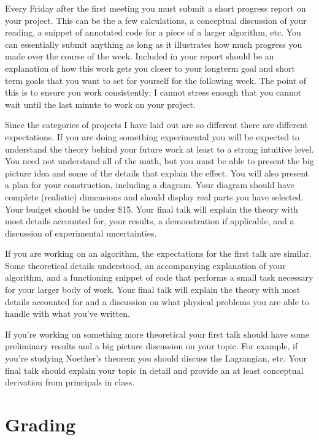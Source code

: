 \documentclass{article}
\begin{document}
Every Friday after the first meeting you must submit a short progress report  on your project.
This can be the a few calculations, a conceptual discussion of your reading, a snippet of annotated code for a piece of a larger algorithm, etc.
You can essentially submit anything as long as it illustrates how much progress you made over the course of the week.
Included in your report should be an explanation of how this work gets you closer to your longterm goal and short term goals that you want to set for yourself for the following week.
The point of this is to ensure you work consistently; I cannot stress enough that you cannot wait until the last minute to work on your project.

Since the categories of projects I have laid out are so different there are different expectations.
If you are doing something experimental you will be expected to understand the theory behind your future work at least to a strong intuitive level.
You need not understand all of the math, but you must be able to present the big picture idea and some of the details that explain the effect.
You will also present a plan for your construction, including a diagram.
Your diagram should have complete (realistic) dimensions and should display real parts you have selected.
Your budget should be under \$15.
Your final talk will explain the theory with most details accounted for, your results, a demonstration if applicable, and a discussion of experimental uncertainties.

If you are working on an algorithm, the expectations for the first talk are similar.
Some theoretical details understood, an accompanying explanation of your algorithm, and a functioning snippet of code that performs a small task necessary for your larger body of work.
Your final talk will explain the theory with most details accounted for and a discussion on what physical problems you are able to handle with what you've written.

If you're working on something more theoretical your first talk should have some preliminary results and a big picture discussion on your topic.
For example, if you're studying Noether's theorem you should discuss the Lagrangian, etc.
Your final talk should explain your topic in detail and provide an at least conceptual derivation from principals in class.


\section{Grading}
\end{document}
